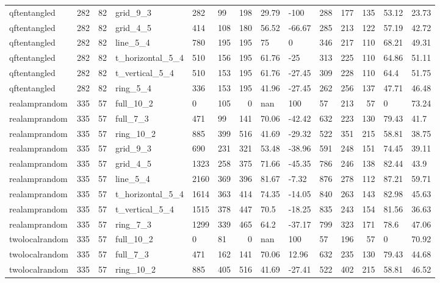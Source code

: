 \begin{longtable}{lrrlllrllllrll}
qftentangled & 282 & 82 & grid\_9\_3 & 282 & 99 & 198 & 29.79 & -100 & 288 & 177 & 135 & 53.12 & 23.73 \\
qftentangled & 282 & 82 & grid\_4\_5 & 414 & 108 & 180 & 56.52 & -66.67 & 285 & 213 & 122 & 57.19 & 42.72 \\
qftentangled & 282 & 82 & line\_5\_4 & 780 & 195 & 195 & 75 & 0 & 346 & 217 & 110 & 68.21 & 49.31 \\
qftentangled & 282 & 82 & t\_horizontal\_5\_4 & 510 & 156 & 195 & 61.76 & -25 & 313 & 225 & 110 & 64.86 & 51.11 \\
qftentangled & 282 & 82 & t\_vertical\_5\_4 & 510 & 153 & 195 & 61.76 & -27.45 & 309 & 228 & 110 & 64.4 & 51.75 \\
qftentangled & 282 & 82 & ring\_5\_4 & 336 & 153 & 195 & 41.96 & -27.45 & 262 & 256 & 137 & 47.71 & 46.48 \\
realamprandom & 335 & 57 & full\_10\_2 & 0 & 105 & 0 & nan & 100 & 57 & 213 & 57 & 0 & 73.24 \\
realamprandom & 335 & 57 & full\_7\_3 & 471 & 99 & 141 & 70.06 & -42.42 & 632 & 223 & 130 & 79.43 & 41.7 \\
realamprandom & 335 & 57 & ring\_10\_2 & 885 & 399 & 516 & 41.69 & -29.32 & 522 & 351 & 215 & 58.81 & 38.75 \\
realamprandom & 335 & 57 & grid\_9\_3 & 690 & 231 & 321 & 53.48 & -38.96 & 591 & 248 & 151 & 74.45 & 39.11 \\
realamprandom & 335 & 57 & grid\_4\_5 & 1323 & 258 & 375 & 71.66 & -45.35 & 786 & 246 & 138 & 82.44 & 43.9 \\
realamprandom & 335 & 57 & line\_5\_4 & 2160 & 369 & 396 & 81.67 & -7.32 & 876 & 278 & 112 & 87.21 & 59.71 \\
realamprandom & 335 & 57 & t\_horizontal\_5\_4 & 1614 & 363 & 414 & 74.35 & -14.05 & 840 & 263 & 143 & 82.98 & 45.63 \\
realamprandom & 335 & 57 & t\_vertical\_5\_4 & 1515 & 378 & 447 & 70.5 & -18.25 & 835 & 243 & 154 & 81.56 & 36.63 \\
realamprandom & 335 & 57 & ring\_7\_3 & 1299 & 339 & 465 & 64.2 & -37.17 & 799 & 323 & 171 & 78.6 & 47.06 \\
twolocalrandom & 335 & 57 & full\_10\_2 & 0 & 81 & 0 & nan & 100 & 57 & 196 & 57 & 0 & 70.92 \\
twolocalrandom & 335 & 57 & full\_7\_3 & 471 & 162 & 141 & 70.06 & 12.96 & 632 & 235 & 130 & 79.43 & 44.68 \\
twolocalrandom & 335 & 57 & ring\_10\_2 & 885 & 405 & 516 & 41.69 & -27.41 & 522 & 402 & 215 & 58.81 & 46.52 \\

\end{longtable}
